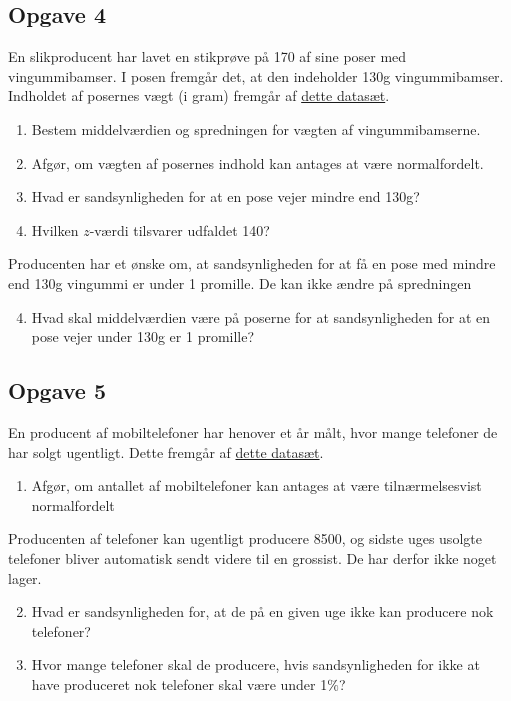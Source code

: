 \subsection*{Opgave 4}

En slikproducent har lavet en stikprøve på 170 af sine poser med vingummibamser. I posen fremgår det, at den indeholder 130g vingummibamser. Indholdet af posernes vægt (i gram) fremgår af \href{https://github.com/ChristianJLex/TeachingNotes/raw/master/2023-2024/Data%20og%20lign/Vingummibamser.xlsx}{\color{blue!60} dette datasæt}. 

\begin{enumerate}[label=\roman*)]
	\item Bestem middelværdien og spredningen for vægten af vingummibamserne.
	\item Afgør, om vægten af posernes indhold kan antages at være normalfordelt.
	\item Hvad er sandsynligheden for at en pose vejer mindre end 130g?
	\item Hvilken $z$-værdi tilsvarer udfaldet 140?
\end{enumerate}
Producenten har et ønske om, at sandsynligheden for at få en pose med mindre end 130g vingummi er under 1 promille. De kan ikke ændre på spredningen
\begin{enumerate}[label=\roman*)]
	\setcounter{enumi}{3}
	\item Hvad skal middelværdien være på poserne for at sandsynligheden for at en pose vejer under 130g er 1 promille?
\end{enumerate}

\subsection*{Opgave 5}
En producent af mobiltelefoner har henover et år målt, hvor mange telefoner de har solgt ugentligt. Dette fremgår af \href{https://github.com/ChristianJLex/TeachingNotes/raw/master/2023-2024/Data og lign/Mobiltelefoner.xlsx}{\color{blue!60} dette datasæt}.

\begin{enumerate}[label=\roman*)]
	\item Afgør, om antallet af mobiltelefoner kan antages at være tilnærmelsesvist normalfordelt
\end{enumerate}
Producenten af telefoner kan ugentligt producere 8500, og sidste uges usolgte telefoner bliver automatisk sendt videre til en grossist. De har derfor ikke noget lager. 
\begin{enumerate}[label=\roman*)]
	\setcounter{enumi}{1}
	\item Hvad er sandsynligheden for, at de på en given uge ikke kan producere nok telefoner?
	\item Hvor mange telefoner skal de producere, hvis sandsynligheden for ikke at have produceret nok telefoner skal være under 1$\%$?
\end{enumerate}

